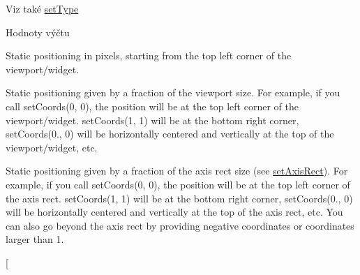 \begin{DoxySeeAlso}{Viz také}
\hyperlink{classQCPItemPosition_aa476abf71ed8fa4c537457ebb1a754ad}{set\+Type} 
\end{DoxySeeAlso}
\begin{Desc}
\item[Hodnoty výčtu]\par
\begin{description}
\item[{\em 
\hypertarget{classQCPItemPosition_aad9936c22bf43e3d358552f6e86dbdc8a564f5e53e550ead1ec5fc7fc7d0b73e0}{}pt\+Absolute\label{classQCPItemPosition_aad9936c22bf43e3d358552f6e86dbdc8a564f5e53e550ead1ec5fc7fc7d0b73e0}
}]Static positioning in pixels, starting from the top left corner of the viewport/widget. \item[{\em 
\hypertarget{classQCPItemPosition_aad9936c22bf43e3d358552f6e86dbdc8ac7d6aa89ceacb39658b0d6da061c789a}{}pt\+Viewport\+Ratio\label{classQCPItemPosition_aad9936c22bf43e3d358552f6e86dbdc8ac7d6aa89ceacb39658b0d6da061c789a}
}]Static positioning given by a fraction of the viewport size. For example, if you call set\+Coords(0, 0), the position will be at the top left corner of the viewport/widget. set\+Coords(1, 1) will be at the bottom right corner, set\+Coords(0., 0) will be horizontally centered and vertically at the top of the viewport/widget, etc. \item[{\em 
\hypertarget{classQCPItemPosition_aad9936c22bf43e3d358552f6e86dbdc8a01080fd00eaf09fa238ef6b73bbfef75}{}pt\+Axis\+Rect\+Ratio\label{classQCPItemPosition_aad9936c22bf43e3d358552f6e86dbdc8a01080fd00eaf09fa238ef6b73bbfef75}
}]Static positioning given by a fraction of the axis rect size (see \hyperlink{classQCPItemPosition_a0cd9b326fb324710169e92e8ca0041c2}{set\+Axis\+Rect}). For example, if you call set\+Coords(0, 0), the position will be at the top left corner of the axis rect. set\+Coords(1, 1) will be at the bottom right corner, set\+Coords(0., 0) will be horizontally centered and vertically at the top of the axis rect, etc. You can also go beyond the axis rect by providing negative coordinates or coordinates larger than 1. \item[{\em 
}
\end{description}
\end{Desc}
